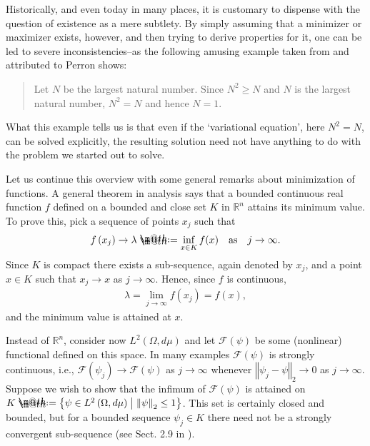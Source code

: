 \documentclass[openany, a4paper, oneside]{jsbook}
\makeatletter
\newcommand*{\defeq}{\mathrel{\rlap{%
\raisebox{0.3ex}{$\m@th\cdot$}}%
\raisebox{-0.3ex}{$\m@th\cdot$}}%
=}
\theoremstyle{break}
\theoremstyle{breakdefn}
\newcommand{\norm}[1]{\left\Vert#1\right\Vert}
\newcommand{\rbk}[1]{\left (#1\right)}
\newcommand{\relmiddle}[1]{\mathrel{}\middle#1\mathrel{}}
\newcommand{\set}[2]{\left\{#1 \relmiddle| #2\right\}}
\newcommand{\bbR}{\mathbb{R}}
\newcommand{\calF}{\mathcal{F}}
\newcommand{\dmu}{d \mu}
\makeatother
\begin{document}
Historically, and even today in many places, it is customary to dispense with the question of existence as a mere subtlety.
By simply assuming that a minimizer or maximizer exists, however, and then trying to derive
properties for it, one can be led to severe inconsistencies--as the following amusing example
taken from \cite{LaurenceYoung1} and attributed to Perron shows:
\begin{quote}
Let $N$ be the largest natural number.
Since $N^2 \geq N$ and $N$ is the largest natural number, $N^2 = N$ and hence $N=1$.
\end{quote}

What this example tells us is that even if the `variational equation', here $N^2 = N$, can be solved explicitly,
the resulting solution need not have anything to do with the problem we started out to solve.

Let us continue this overview with some general remarks about minimization of functions.
A general theorem in analysis says that a bounded continuous real function $f$ defined on a bounded and close set $K$
in $\bbR^n$ attains its minimum value.
To prove this, pick a sequence of points $x_j$ such that
\begin{align}
 f \rbk{x_j} \to \lambda
 \defeq
 \inf_{x \in K} f (x) \quad \text{as} \quad j \to \infty.
\end{align}
Since $K$ is compact there exists a sub-sequence, again denoted by $x_j$, and a point $x \in K$ such that $x_j \to x$ as $j \to \infty$.
Hence, since $f$ is continuous,
\begin{align}
 \lambda
 =
 \lim_{j \to \infty} f (x_j) = f (x),
\end{align}
and the minimum value is attained at $x$.

Instead of $\bbR^n$, consider now $L^2 \rbk{\Omega, \dmu}$ and let $\calF \rbk{\psi}$ be some (nonlinear) functional
defined on this space.
In many examples $\calF (\psi)$ is strongly continuous, i.e., $\calF (\psi_j) \to \calF \rbk{\psi}$ as $j \to \infty$
whenever $\norm{\psi_j - \psi}_2 \to 0$ as $j \to \infty$.
Suppose we wish to show that the infimum of $\calF (\psi)$ is attained on $K \defeq \set{\psi \in L^2 \rbk{\Omega, \dmu}}{\norm{\psi}_2 \leq 1}$.
This set is certainly closed and bounded, but for a bounded sequence $\psi_j \in K$
there need not be a strongly convergent sub-sequence (see Sect. 2.9 in \cite{LiebLoss1}).
\end{document}
